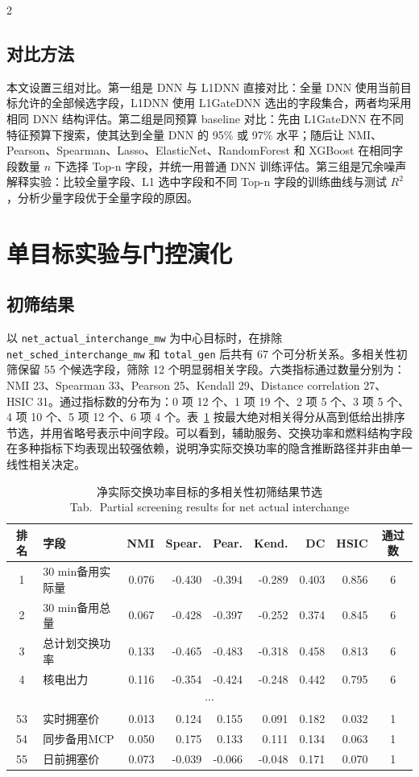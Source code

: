 \documentclass[UTF8,zihao=5,twoside]{ctexart}
\numberwithin{equation}{section}
\newcommand{\tabbicaption}[2]{%
  \caption{#1\\[-0.2em]\small Tab.\,\thetable\ #2}
}
\newcommand{\code}[1]{\texttt{#1}}
\begin{document}
\begin{multicols}{2}
\subsection{对比方法}
本文设置三组对比。第一组是 DNN 与 L1DNN 直接对比：全量 DNN 使用当前目标允许的全部候选字段，L1DNN 使用 L1GateDNN 选出的字段集合，两者均采用相同 DNN 结构评估。第二组是同预算 baseline 对比：先由 L1GateDNN 在不同特征预算下搜索，使其达到全量 DNN 的 95\% 或 97\% 水平；随后让 NMI、Pearson、Spearman、Lasso、ElasticNet、RandomForest 和 XGBoost 在相同字段数量 $n$ 下选择 Top-n 字段，并统一用普通 DNN 训练评估。第三组是冗余噪声解释实验：比较全量字段、L1 选中字段和不同 Top-n 字段的训练曲线与测试 $R^2$，分析少量字段优于全量字段的原因。

\section{单目标实验与门控演化}
\subsection{初筛结果}
以 \code{net\_actual\_interchange\_mw} 为中心目标时，在排除 \code{net\_sched\_interchange\_mw} 和 \code{total\_gen} 后共有 67 个可分析关系。多相关性初筛保留 55 个候选字段，筛除 12 个明显弱相关字段。六类指标通过数量分别为：NMI 23、Spearman 33、Pearson 25、Kendall 29、Distance correlation 27、HSIC 31。通过指标数的分布为：0 项 12 个、1 项 19 个、2 项 5 个、3 项 5 个、4 项 10 个、5 项 12 个、6 项 4 个。表~\ref{tab:screening_top} 按最大绝对相关得分从高到低给出排序节选，并用省略号表示中间字段。可以看到，辅助服务、交换功率和燃料结构字段在多种指标下均表现出较强依赖，说明净实际交换功率的隐含推断路径并非由单一线性相关决定。

\begin{table}[H]
\centering
\scriptsize
\setlength{\tabcolsep}{1pt}
\tabbicaption{净实际交换功率目标的多相关性初筛结果节选}{Partial screening results for net actual interchange}
\label{tab:screening_top}
\begin{tabularx}{\columnwidth}{cXrrrrrrc}
\toprule
排名 & 字段 & NMI & Spear. & Pear. & Kend. & DC & HSIC & 通过数 \\
\midrule
1 & 30 min备用实际量 & 0.076 & -0.430 & -0.394 & -0.289 & 0.403 & 0.856 & 6 \\
2 & 30 min备用总量 & 0.067 & -0.428 & -0.397 & -0.252 & 0.374 & 0.845 & 6 \\
3 & 总计划交换功率 & 0.133 & -0.465 & -0.483 & -0.318 & 0.458 & 0.813 & 6 \\
4 & 核电出力 & 0.116 & -0.354 & -0.424 & -0.248 & 0.442 & 0.795 & 6 \\
\multicolumn{9}{c}{\(\cdots\)} \\
53 & 实时拥塞价 & 0.013 & 0.124 & 0.155 & 0.091 & 0.182 & 0.032 & 1 \\
54 & 同步备用MCP & 0.050 & 0.175 & 0.133 & 0.111 & 0.134 & 0.063 & 1 \\
55 & 日前拥塞价 & 0.073 & -0.039 & -0.066 & -0.048 & 0.171 & 0.070 & 1 \\
\bottomrule
\end{tabularx}
\end{table}


\end{multicols}
\end{document}
